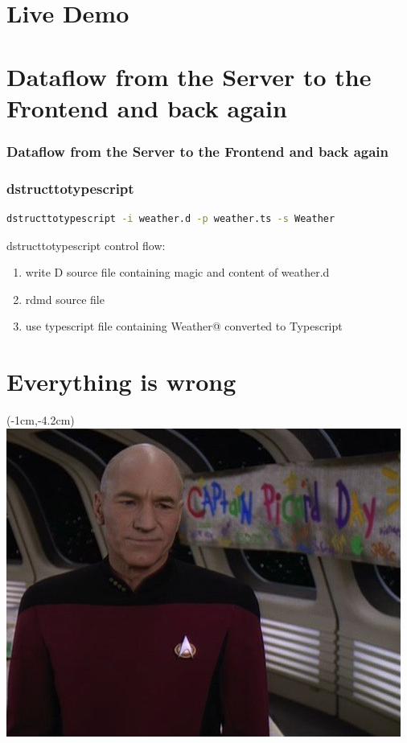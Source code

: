 \documentclass[xelatex,13pt]{beamer}
\begin{document}
\section{Live Demo}

\section{Dataflow from the Server to the Frontend and back again}
\begin{frame}
	\frametitle{Dataflow from the Server to the Frontend and back again}
	
	\pause
	
\end{frame}

\begin{frame}[fragile]
	\frametitle{dstructtotypescript}
\begin{lstlisting}[numbers=none,language=bash]
dstructtotypescript -i weather.d -p weather.ts -s Weather
\end{lstlisting}
\pause
dstructtotypescript control flow:
\begin{enumerate}
	\item write D source file containing magic and content of weather.d	
	\item rdmd source file
	\item use typescript file containing \lstinline@struct Weather@ converted
		to Typescript
\end{enumerate}
\end{frame}

\section{Everything is wrong}
\begin{frame}
\begin{textblock*}{0cm}(-1cm,-4.2cm)
	\includegraphics[width=1.0\paperwidth]{picarddday.jpg}
\end{textblock*}
\end{frame}
\end{document}
